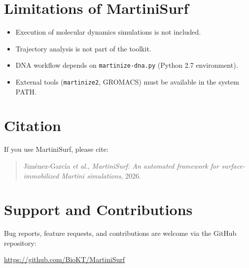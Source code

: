 \documentclass[11pt]{article}
\begin{document}
\section{Limitations of MartiniSurf}

\begin{itemize}
  \item Execution of molecular dynamics simulations is not included.
  \item Trajectory analysis is not part of the toolkit.
  \item DNA workflow depends on \texttt{martinize-dna.py} (Python 2.7 environment).
  \item External tools (\texttt{martinize2}, GROMACS) must be available in the system PATH.
\end{itemize}

\section{Citation}

If you use MartiniSurf, please cite:

\begin{quote}
Jiménez-García \emph{et al.}, \textit{MartiniSurf: An automated framework for surface-immobilized Martini simulations}, 2026.
\end{quote}

\section{Support and Contributions}

Bug reports, feature requests, and contributions are welcome via the
GitHub repository:

\begin{center}
\url{https://github.com/BioKT/MartiniSurf}
\end{center}

\end{document}
